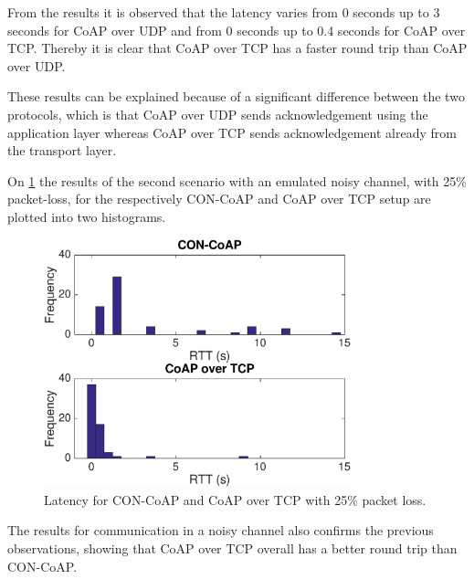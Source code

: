 From the results it is observed  that the latency varies from 0 seconds up to 3 seconds for CoAP over UDP and from 0 seconds up to 0.4 seconds for CoAP over TCP. Thereby it is clear that CoAP over TCP has a faster round trip than CoAP over UDP. 

These results can be explained because of a significant difference between the two protocols, which is that CoAP over UDP sends acknowledgement using the application layer whereas CoAP over TCP sends acknowledgement already from the transport layer. 

On \figurename{\ref{fig:latencynoisy}} the results of the second scenario with an emulated noisy channel, with 25\% packet-loss, for the respectively CON-CoAP and CoAP over TCP setup are plotted into two histograms. 
\begin{figure}[bht]
	\centering
	\includegraphics[width=3.5in]{gfx/latencynoise}
	\caption{Latency for CON-CoAP and CoAP over TCP with 25\% packet loss.}
	\label{fig:latencynoisy}
\end{figure}

The results for communication in a noisy channel also confirms the previous observations, showing that CoAP over TCP overall has a better round trip than CON-CoAP. %